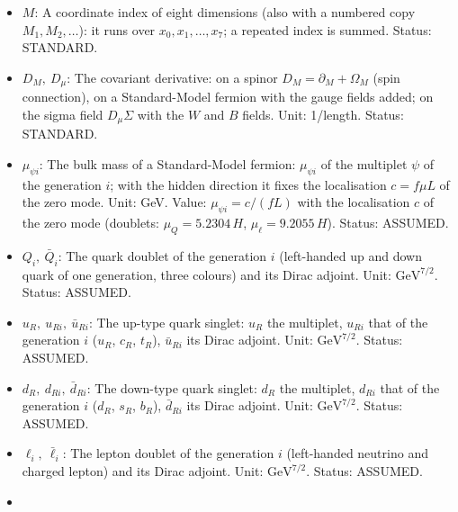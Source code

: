 \documentclass[
  10pt,
]{article}
\begin{document}
\begin{itemize}
  \(\gamma^a,\ \gamma^M,\ \gamma^\mu\): The Dirac matrices: \(\gamma^a\)
  with a frame index are the author's real \(16 \times 16\) matrices of
  the Clifford algebra of signature \((4, 4)\);
  \(\gamma^M = \mathbf{e}_a{}^M\gamma^a\) along a coordinate
  (\(\gamma^{x_0}\), \(\gamma^{x_4}\), \ldots{} the matrices along
  \(x_0\), \(x_4\), \ldots), \(\gamma_M = g_{MN}\gamma^N\);
  \(\gamma^\mu\) the matrices of the four observable directions in
  four-dimensional formulas. Unit: dimensionless. Status: AUTHOR.
\item
  \(M\): A coordinate index of eight dimensions (also with a numbered
  copy \(M_1, M_2, \dots\)): it runs over \(x_0, x_1, \dots, x_7\); a
  repeated index is summed. Status: STANDARD.
\item
  \(D_M,\ D_\mu\): The covariant derivative: on a spinor
  \(D_M = \partial_M + \Omega_M\) (spin connection), on a Standard-Model
  fermion with the gauge fields added; on the sigma field
  \(D_\mu\Sigma\) with the \(W\) and \(B\) fields. Unit: 1/length.
  Status: STANDARD.
\item
  \(\mu_{\psi i}\): The bulk mass of a Standard-Model fermion:
  \(\mu_{\psi i}\) of the multiplet \(\psi\) of the generation \(i\);
  with the hidden direction it fixes the localisation \(c = f\mu L\) of
  the zero mode. Unit: GeV. Value: \(\mu_{\psi i} = c/(fL)\) with the
  localisation \(c\) of the zero mode (doublets: \(\mu_Q = 5.2304\,H\),
  \(\mu_\ell = 9.2055\,H\)). Status: ASSUMED.
\item
  \(Q_i,\ \bar Q_i\): The quark doublet of the generation \(i\)
  (left-handed up and down quark of one generation, three colours) and
  its Dirac adjoint. Unit: \(\mathrm{GeV}^{7/2}\). Status: ASSUMED.
\item
  \(u_R,\ u_{Ri},\ \bar u_{Ri}\): The up-type quark singlet: \(u_R\) the
  multiplet, \(u_{Ri}\) that of the generation \(i\) (\(u_R\), \(c_R\),
  \(t_R\)), \(\bar u_{Ri}\) its Dirac adjoint. Unit:
  \(\mathrm{GeV}^{7/2}\). Status: ASSUMED.
\item
  \(d_R,\ d_{Ri},\ \bar d_{Ri}\): The down-type quark singlet: \(d_R\)
  the multiplet, \(d_{Ri}\) that of the generation \(i\) (\(d_R\),
  \(s_R\), \(b_R\)), \(\bar d_{Ri}\) its Dirac adjoint. Unit:
  \(\mathrm{GeV}^{7/2}\). Status: ASSUMED.
\item
  \(\ell_i,\ \bar\ell_i\): The lepton doublet of the generation \(i\)
  (left-handed neutrino and charged lepton) and its Dirac adjoint. Unit:
  \(\mathrm{GeV}^{7/2}\). Status: ASSUMED.
\item

\end{itemize}
\end{document}
